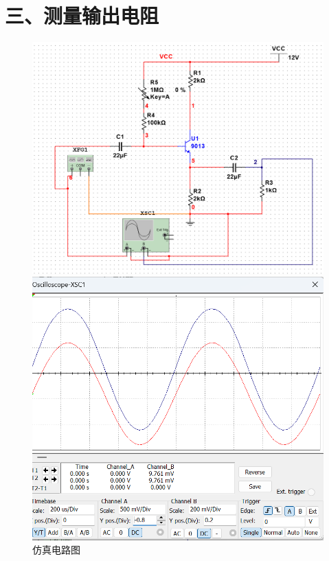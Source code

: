 \documentclass[a4paper,10pt,notitlepage]{article}
\begin{document}
	\section*{三、测量输出电阻}
	\begin{figure}[h]
		\raggedright
		\begin{minipage}{0.3\textwidth}
			\centering
			\includegraphics[width=\textwidth]{6.png}
			\caption*{仿真电路图}
		\end{minipage}
		\qquad
		\begin{minipage}{0.28\textwidth}
			\centering
			\includegraphics[width=\textwidth]{7.png}

\end{minipage}
\end{figure}
\end{document}
